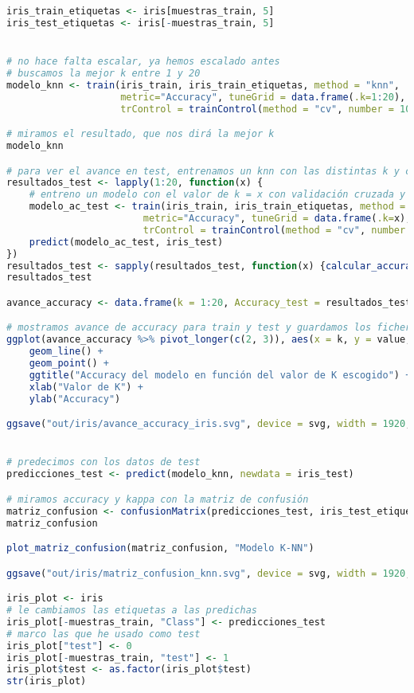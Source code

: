 \begin{lstlisting}[language=R]
iris_train_etiquetas <- iris[muestras_train, 5]
iris_test_etiquetas <- iris[-muestras_train, 5]


# no hace falta escalar, ya hemos escalado antes
# buscamos la mejor k entre 1 y 20
modelo_knn <- train(iris_train, iris_train_etiquetas, method = "knn",
					metric="Accuracy", tuneGrid = data.frame(.k=1:20),
					trControl = trainControl(method = "cv", number = 10))

# miramos el resultado, que nos dirá la mejor k
modelo_knn

# para ver el avance en test, entrenamos un knn con las distintas k y calculamos su accuracy en test
resultados_test <- lapply(1:20, function(x) {
	# entreno un modelo con el valor de k = x con validación cruzada y predigo con ese modelo
	modelo_ac_test <- train(iris_train, iris_train_etiquetas, method = "knn",
						metric="Accuracy", tuneGrid = data.frame(.k=x),
						trControl = trainControl(method = "cv", number = 10))
	predict(modelo_ac_test, iris_test)
})
resultados_test <- sapply(resultados_test, function(x) {calcular_accuracy(iris_test_etiquetas, x)})
resultados_test

avance_accuracy <- data.frame(k = 1:20, Accuracy_test = resultados_test, Accuracy_train = modelo_knn$results$Accuracy)

# mostramos avance de accuracy para train y test y guardamos los ficheros
ggplot(avance_accuracy %>% pivot_longer(c(2, 3)), aes(x = k, y = value, color = name)) +
	geom_line() +
	geom_point() +
	ggtitle("Accuracy del modelo en función del valor de K escogido") +
	xlab("Valor de K") +
	ylab("Accuracy")

ggsave("out/iris/avance_accuracy_iris.svg", device = svg, width = 1920, height = 1080, units = "px", dpi = 150)


# predecimos con los datos de test
predicciones_test <- predict(modelo_knn, newdata = iris_test)

# miramos accuracy y kappa con la matriz de confusión
matriz_confusion <- confusionMatrix(predicciones_test, iris_test_etiquetas)
matriz_confusion

plot_matriz_confusion(matriz_confusion, "Modelo K-NN")

ggsave("out/iris/matriz_confusion_knn.svg", device = svg, width = 1920, height = 1080, units = "px", dpi = 150)

iris_plot <- iris
# le cambiamos las etiquetas a las predichas
iris_plot[-muestras_train, "Class"] <- predicciones_test
# marco las que he usado como test
iris_plot["test"] <- 0
iris_plot[-muestras_train, "test"] <- 1
iris_plot$test <- as.factor(iris_plot$test)
str(iris_plot)


\end{lstlisting}
